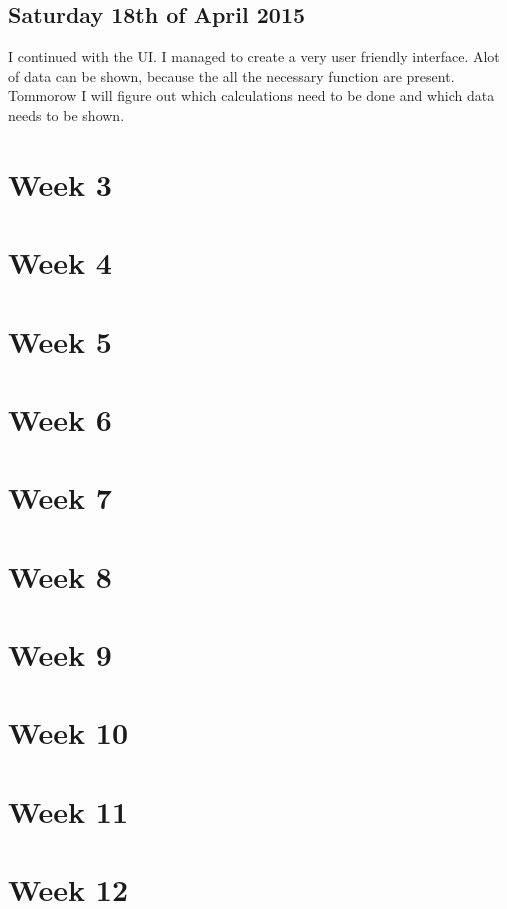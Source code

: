 \documentclass{article}
\begin{document}
\subsection{Saturday 18th of April 2015}
I continued with the UI. I managed to create a very user friendly interface. Alot of data can be shown, because the all the necessary function are present. Tommorow I will figure out which calculations need to be done and which data needs to be shown.

\section{Week 3}


\section{Week 4}


\section{Week 5}


\section{Week 6}


\section{Week 7}


\section{Week 8}


\section{Week 9}


\section{Week 10}


\section{Week 11}


\section{Week 12}




\end{document}
